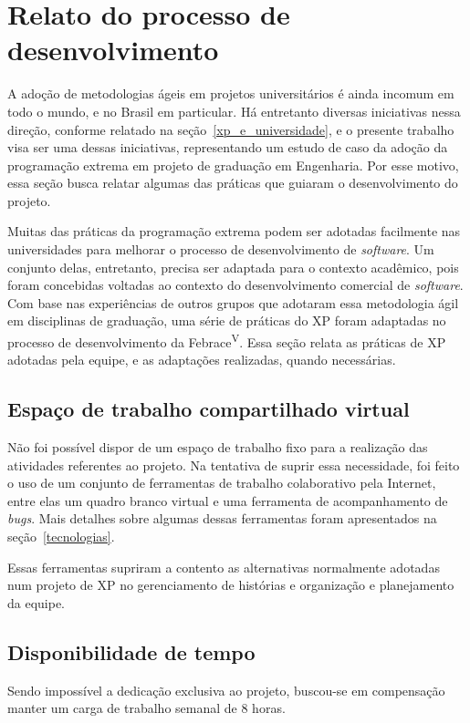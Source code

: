 \section{Relato do processo de desenvolvimento}

  A adoção de metodologias ágeis em projetos universitários é ainda incomum em todo o mundo, e no Brasil em particular. Há entretanto diversas iniciativas nessa direção, conforme relatado na seção~\ref{xp_e_universidade}, e o presente trabalho visa ser uma dessas iniciativas, representando um estudo de caso da adoção da programação extrema em projeto de graduação em Engenharia. Por esse motivo, essa seção busca relatar algumas das práticas que guiaram o desenvolvimento do projeto.

  Muitas das práticas da programação extrema podem ser adotadas facilmente nas universidades para melhorar o processo de desenvolvimento de \textit{software}. Um conjunto delas, entretanto, precisa ser adaptada para o contexto acadêmico, pois foram concebidas voltadas ao contexto do desenvolvimento comercial de \textit{software}. Com base nas experiências de outros grupos que adotaram essa metodologia ágil em disciplinas de graduação, uma série de práticas do XP foram adaptadas no processo de desenvolvimento da Febrace\textsuperscript{V}. Essa seção relata as práticas de XP adotadas pela equipe, e as adaptações realizadas, quando necessárias.

  \subsection{Espaço de trabalho compartilhado virtual}
    Não foi possível dispor de um espaço de trabalho fixo para a realização das atividades referentes ao projeto. Na tentativa de suprir essa necessidade, foi feito o uso de um conjunto de ferramentas de trabalho colaborativo pela Internet, entre elas um quadro branco virtual e uma ferramenta de acompanhamento de \textit{bugs}. Mais detalhes sobre algumas dessas ferramentas foram apresentados na seção~\ref{tecnologias}.

    Essas ferramentas supriram a contento as alternativas normalmente adotadas num projeto de XP no gerenciamento de histórias e organização e planejamento da equipe.

  \subsection{Disponibilidade de tempo}
    Sendo impossível a dedicação exclusiva ao projeto, buscou-se em compensação manter um carga de trabalho semanal de 8 horas.

